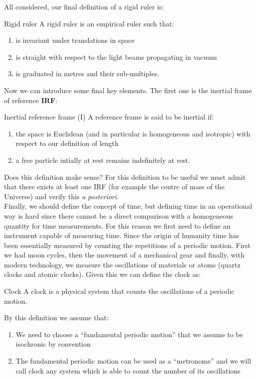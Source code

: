 All considered, our final definition of a rigid ruler is:
\begin{definition}{Rigid ruler}
  A rigid ruler is an empirical ruler such that:
  \begin{enumerate}
    \item is invariant under translations in space
    \item is straight with respect to the light beams propagating in vacuum
    \item is graduated in metres and their sub-multiples.
  \end{enumerate}
\end{definition}
Now we can introduce some final key elements. The first one is the inertial frame of reference \textbf{IRF}:
\begin{definition}{Inertial reference frame (I)}
  A reference frame is said to be inertial if:
  \begin{enumerate}
    \item the space is Euclidean (and in particular is homogeneous and isotropic) with respect to our definition of length
    \item a free particle intially at rest remains indefinitely at rest.
  \end{enumerate}
\end{definition}
Does this definition make sense? For this definition to be useful we must admit that there exists at least one IRF (for example the centre of mass of the Universe) and verify this \textit{a posteriori}.\\
Finally, we should define the concept of time, but defining time in an operational way is hard since there cannot be a direct comparison with a homogeneous quantity for time measurements. For this reason we first need to define an instrument capable of measuring time. Since the origin of humanity time has been essentially measured by counting the repetitions of a periodic motion. First we had moon cycles, then the movement of a mechanical gear and finally, with modern technology, we measure the oscillations of materials or atoms (quartz clocks and atomic clocks). Given this we can define the clock as:
\begin{definition}{Clock}
  A clock is a physical system that counts the oscillations of a periodic motion.
\end{definition}
By this definition we assume that:
\begin{enumerate}
  \item We need to choose a ``fundamental periodic motion'' that we assume to be isochronic by convention
  \item The fundamental periodic motion can be used as a ``metronome'' and we will call clock any system which
  is able to count the number of its oscillations
\end{enumerate}
